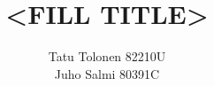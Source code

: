 \documentclass[12pt,a4paper,finnish,oneside]{article}
\begin{document}



\pagestyle{plain}


%
%

\author{Tatu Tolonen 82210U \\ Juho Salmi 80391C}

\title{<FILL TITLE>}

\end{document}
